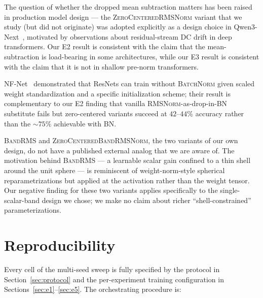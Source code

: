 \documentclass{article}
\newcommand{\rms}{\textsc{RMSNorm}}
\newcommand{\bandrms}{\textsc{BandRMS}}
\newcommand{\zcrms}{\textsc{ZeroCentered}\-\textsc{RMSNorm}}
\newcommand{\zcband}{\textsc{ZeroCentered}\-\textsc{BandRMSNorm}}
\newcommand{\batchnorm}{\textsc{BatchNorm}}
\begin{document}
The question of whether the dropped mean subtraction matters has been raised in production model design --- the \zcrms{} variant that we study (but did not originate) was adopted explicitly as a design choice in Qwen3-Next~\citep{qwen3next2025}, motivated by observations about residual-stream DC drift in deep transformers.
Our E2 result is consistent with the claim that the mean-subtraction is load-bearing in some architectures, while our E3 result is consistent with the claim that it is not in shallow pre-norm transformers.

NF-Net~\citep{brock2021high} demonstrated that ResNets can train without \batchnorm{} given scaled weight standardization and a specific initialization scheme; their result is complementary to our E2 finding that vanilla \rms{}-as-drop-in-BN substitute fails but zero-centered variants succeed at $42$--$44\%$ accuracy rather than the $\sim 75\%$ achievable with BN.

\bandrms{} and \zcband{}, the two variants of our own design, do not have a published external analog that we are aware of.
The motivation behind \bandrms{} --- a learnable scalar gain confined to a thin shell around the unit sphere --- is reminiscent of weight-norm-style spherical reparametrizations but applied at the activation rather than the weight tensor.
Our negative finding for these two variants applies specifically to the single-scalar-band design we chose; we make no claim about richer ``shell-constrained'' parameterizations.

\section{Reproducibility}
\label{sec:repro}

Every cell of the multi-seed sweep is fully specified by the protocol in Section~\ref{sec:protocol} and the per-experiment training configuration in Sections~\ref{sec:e1}--\ref{sec:e5}.
The orchestrating procedure is:
\end{document}
